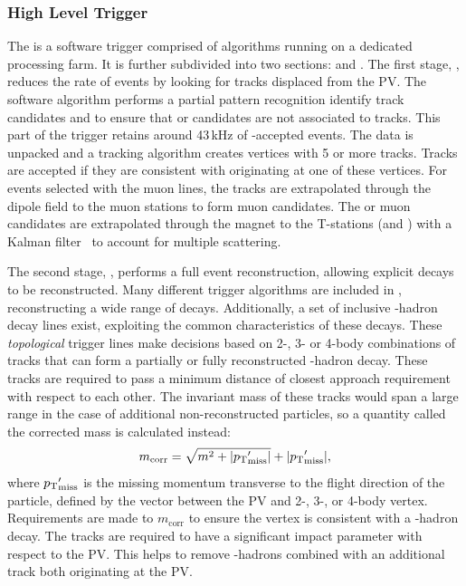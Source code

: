 \subsubsection{High Level Trigger}

The \hlt is a software trigger comprised of \cpp algorithms running on a dedicated processing farm. It is further subdivided into two sections: \hltone and \hlttwo. 
The first stage, \hltone, reduces the rate of events by looking for tracks displaced from the PV.
The software algorithm performs a partial pattern recognition identify track candidates and to ensure that \Pgamma or \piz \lone candidates are not associated to tracks. This part of the trigger retains around 43\,kHz of \lone-accepted events.
The \velo data is unpacked and a tracking algorithm creates vertices with 5 or more tracks.
Tracks are accepted if they are consistent with originating at one of these vertices. For events selected with the muon \lone lines, the \velo tracks are extrapolated through the dipole field to the muon stations to form muon candidates. 
The \velo or muon candidates are extrapolated through the magnet to the T-stations (\ot and \intr) with a Kalman filter~\cite{Kalmanone,FRUHWIRTH1987444} to account for multiple scattering.




The second stage, \hlttwo, performs a full event reconstruction, allowing explicit decays to be reconstructed. Many different trigger algorithms are included in \hlttwo, reconstructing a wide range of decays. Additionally, a set of inclusive \bquark-hadron decay lines exist, exploiting the common characteristics of these decays. These \emph{topological} trigger lines make decisions based on 2-, 3- or 4-body combinations of tracks that can form a partially or fully reconstructed \bquark-hadron decay. These tracks are required to pass a minimum distance of closest approach requirement with respect to each other. The invariant mass of these tracks would span a large range in the case of additional non-reconstructed particles, so a quantity called the corrected mass is calculated instead:
\begin{equation}
m_{\text{corr}} = \sqrt{m^{2} + |\mbox{$p_{\mathrm{ T}}$}'_{\text{miss}}|} + |\mbox{$p_{\mathrm{ T}}$}'_{\text{miss}}|,
\end{equation}   
where $\mbox{$p_{\mathrm{ T}}$}'_{\text{miss}}$ is the missing momentum transverse to the flight direction of the particle, defined by the vector between the PV and 2-, 3-, or 4-body vertex. Requirements are made to $m_{\text{corr}}$ to ensure the vertex is consistent with a \bquark-hadron decay.
The tracks are required to have a significant impact parameter with respect to the PV. This helps to remove \cquark-hadrons combined with an additional track both originating at the PV.



